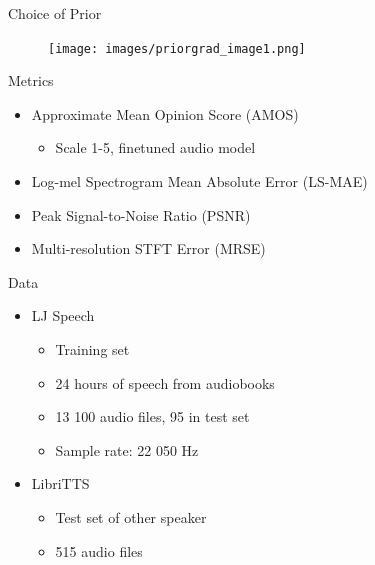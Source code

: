 \documentclass{beamer}
\begin{document}

\begin{frame}{Choice of Prior}

    \begin{figure}[H]
        \centering
        \texttt{[image: images/priorgrad\_image1.png]}
    \end{figure}
    
\end{frame}


\begin{frame}{Metrics}

    \begin{itemize}
        \setlength\itemsep{1.5em}
        \item Approximate Mean Opinion Score (AMOS)
        \begin{itemize}
            \item Scale 1-5, finetuned audio model 
        \end{itemize}
        \item Log-mel Spectrogram Mean Absolute Error (LS-MAE)
        \item Peak Signal-to-Noise Ratio (PSNR)
        \item Multi-resolution STFT Error (MRSE)
    \end{itemize}

\end{frame}


\begin{frame}{Data}
\large
    \begin{itemize}
        \setlength\itemsep{1.5em}
        \item LJ Speech
        \begin{itemize}
            \setlength\itemsep{0.5em}
            \item Training set
            \item 24 hours of speech from audiobooks 
            \item 13 100 audio files, 95 in test set
            \item Sample rate: 22 050 Hz
        \end{itemize}
        \item LibriTTS
        \begin{itemize}
            \setlength\itemsep{0.5em}
            \item Test set of other speaker
            \item 515 audio files
        \end{itemize}
    \end{itemize}
    
\end{frame}
\end{document}
